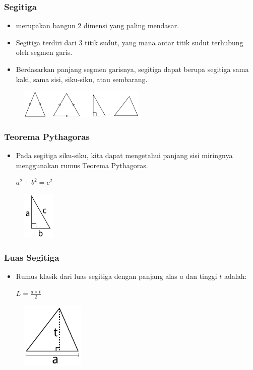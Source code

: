 \begin{frame}
\frametitle{Segitiga}
\begin{itemize}
  \item {} merupakan bangun 2 dimensi yang paling mendasar.
  \item Segitiga terdiri dari 3 titik sudut, yang mana antar titik sudut terhubung oleh segmen garis.
  \item Berdasarkan panjang segmen garisnya, segitiga dapat berupa segitiga sama kaki, sama sisi, siku-siku, atau sembarang.
\end{itemize}
\begin{figure}
  \includegraphics[width=6cm]{asset/triangles.pdf}
\end{figure}
\end{frame}

\begin{frame}
\frametitle{Teorema Pythagoras}
\begin{itemize}
  \item Pada segitiga siku-siku, kita dapat mengetahui panjang sisi miringnya menggunakan rumus Teorema Pythagoras.
  
  \(a^2 + b^2 = c^2\)
\end{itemize}
\begin{figure}
  \includegraphics[width=1.5cm]{asset/pythagoras.pdf}
\end{figure}
\end{frame}

\begin{frame}
\frametitle{Luas Segitiga}
\begin{itemize}
  \item Rumus klasik dari luas segitiga dengan panjang alas $a$ dan tinggi $t$ adalah:\newline
  
  \(\displaystyle L = \frac{a \times t}{2}\)
\end{itemize}
\begin{figure}
  \includegraphics[width=3cm]{asset/triangle-area.pdf}
\end{figure}
\end{frame}

